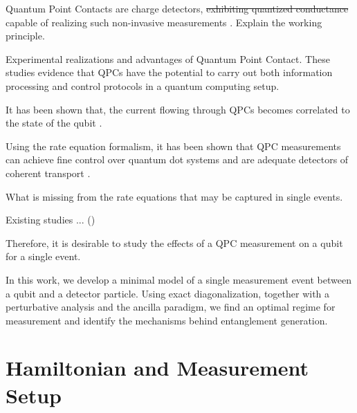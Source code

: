 \documentclass[10pt,
 amsmath,amssymb,
 aps,prb, twocolumn
]{revtex4-2}
\begin{document}
Quantum Point Contacts are charge detectors, \st{exhibiting quantized conductance} \cite{wharam1988, vanhouten1996,vanwees1988, tekman1991} capable of realizing such non-invasive measurements \cite{field1993}. Explain the working principle.

Experimental realizations and advantages of Quantum Point Contact. These studies evidence that QPCs have the potential to carry out both information processing and control protocols in a quantum computing setup.

 It has been shown that, the current flowing through QPCs becomes correlated to the state of the qubit \cite{gurvitz1996,  gurvitz1997, korotkov2001}.

Using the rate equation formalism, it has been shown that QPC measurements can achieve fine control over quantum dot systems \cite{ferguson2023, zilberberg2014} and are adequate detectors of coherent transport \cite{rech2011, zilberberg2019}. 

 What is missing from the rate equations that may be captured in single events. 

 Existing studies ... ()

Therefore, it is desirable to study the effects of a QPC measurement on a qubit for a single event.

In this work, we develop a minimal model of a single measurement event between a qubit and a detector particle. Using exact diagonalization, together with a perturbative analysis and the ancilla paradigm, we find an optimal regime for measurement and identify the mechanisms behind entanglement generation.

\section{Hamiltonian and Measurement Setup}\label{sect:model}
\end{document}
